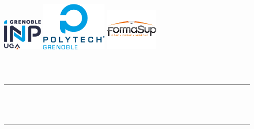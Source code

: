 
\begin{titlepage}

    \setlength{\wpYoffset}{-8.5cm}


    \includegraphics[width=0.15\textwidth]{logos/grenoble-inp.png}
    \hfill
    \includegraphics[width=0.25\textwidth]{logos/polytech-vertical.png}
    \hfill
    \includegraphics[width=0.2\textwidth]{logos/formasup-ida_big.png}\par\vspace{1cm}

    \centering

    {
        \scshape\LARGE \school \par \university \par
    }

    \vspace{1.5cm}

    {
        \scshape\Large \department \\ \univyear \\ \motive\par
    }

    \vspace{1cm}

    \rule{\linewidth}{0.2 mm} \\[0.4 cm]

    {
        \huge\bfseries \textsc{\MyTitle} \par
    } \
    \rule{\linewidth}{0.2 mm} \\[1.5 cm]


\end{titlepage}
